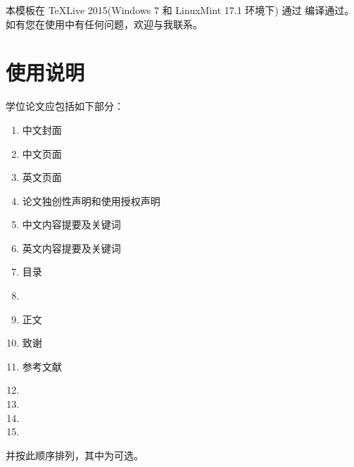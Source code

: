 \documentclass[figurelist,tablelist,algorithmlist,nomlist,masters]{seuthesix}
\begin{document}
	本模板在 \TeX{Live} 2015(Windows 7 和 LinuxMint 17.1 环境下) 通过 编译通过。
	如有您在使用中有任何问题，欢迎与我联系。
	
	\chapter{使用说明}
	学位论文应包括如下部分：\\
	\begin{enumerate}
		\itshape
		\item 中文封面
		\item 中文页面
		\item 英文页面
		\item 论文独创性声明和使用授权声明
		\item 中文内容提要及关键词
		\item 英文内容提要及关键词
		\item 目录
		\item {}
		\item 正文
		\item 致谢
		\item 参考文献
		\item  {}
		\item {}
		\item  {}
		\item {}
	\end{enumerate}
	并按此顺序排列，其中为可选。
	
	
\end{document}
